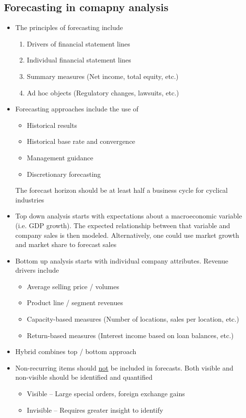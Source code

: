 \documentclass[../notes_compiled.tex]{subfiles}
\begin{document}
\subsection{Forecasting in comapny analysis}
\begin{itemize}
\item The principles of forecasting include
\begin{enumerate}
\item Drivers of financial statement lines
\item Individual financial statement lines
\item Summary measures (Net income, total equity, etc.)
\item Ad hoc objects (Regulatory changes, lawsuits, etc.)
\end{enumerate}
\item Forecasting approaches include the use of
\begin{itemize}
\item Historical results
\item Historical base rate and convergence
\item Management guidance
\item Discretionary forecasting
\end{itemize}
The forecast horizon should be at least half a business cycle for cyclical industries
\item Top down analysis starts with expectations about a macroeconomic variable (i.e. GDP growth). The expected relationship between that variable and company sales is then modeled. Alternatively, one could use market growth and market share to forecast sales
\item Bottom up analysis starts with individual company attributes. Revenue drivers include
\begin{itemize}
\item Average selling price / volumes
\item Product line / segment revenues
\item Capacity-based measures (Number of locations, sales per location, etc.)
\item Return-based measures (Interest income based on loan balances, etc.)
\end{itemize}
\item Hybrid combines top / bottom approach
\item Non-recurring items should \underline{not} be included in forecasts. Both visible and non-visible should be identified and quantified
\begin{itemize}
\item Visible -- Large special orders, foreign exchange gains
\item Invisible -- Requires greater insight to identify
\end{itemize}
\end{itemize}
\end{document}
